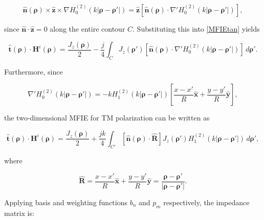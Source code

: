 \documentclass[11pt,a4paper,twoside,pdf]{article}
\numberwithin{equation}{section}
\begin{document}
\begin{equation}
\hat{\mathbf{n}}(\boldsymbol{\rho}) \times
\hat{\mathbf{z}} \times
\nabla H_0^{(2)}\!\left( k \lvert \boldsymbol{\rho} - \boldsymbol{\rho}' \rvert \right)
=
\hat{\mathbf{z}}
\left[
\hat{\mathbf{n}}(\boldsymbol{\rho}) \cdot
\nabla' H_0^{(2)}\!\left( k \lvert \boldsymbol{\rho} - \boldsymbol{\rho}' \rvert \right)
\right],
\end{equation}

since
$\hat{\mathbf{n}} \cdot \hat{\mathbf{z}} = 0$
along the entire contour $C$.
Substituting this into \ref{MFIEtan} yields

\begin{equation}
\hat{\mathbf{t}}(\boldsymbol{\rho}) \cdot \mathbf{H}^i(\boldsymbol{\rho})
=
\frac{J_z(\boldsymbol{\rho})}{2}
-
\frac{j}{4}
\int_{C}
J_z(\boldsymbol{\rho}')
\left[
\hat{\mathbf{n}}(\boldsymbol{\rho}) \cdot
\nabla' H_0^{(2)}\!\left( k \lvert \boldsymbol{\rho} - \boldsymbol{\rho}' \rvert \right)
\right]
\, d\boldsymbol{\rho'}.
\end{equation}

Furthermore, since

\begin{equation}
\nabla' H_0^{(2)}\!\left( k \lvert \boldsymbol{\rho} - \boldsymbol{\rho}' \rvert \right)
=
- k H_1^{(2)}\!\left( k \lvert \boldsymbol{\rho} - \boldsymbol{\rho}' \rvert \right)
\left[
\frac{x - x'}{R} \hat{\mathbf{x}}
+
\frac{y - y'}{R} \hat{\mathbf{y}}
\right],
\end{equation}

the two-dimensional MFIE for TM polarization can be written as

\begin{equation}
\hat{\mathbf{t}}(\boldsymbol{\rho}) \cdot \mathbf{H}^i(\boldsymbol{\rho})
=
\frac{J_z(\boldsymbol{\rho})}{2}
+
\frac{j k}{4}
\int_{C'}
\left[
\hat{\mathbf{n}}(\boldsymbol{\rho}) \cdot \hat{\mathbf{R}}
\right]
J_z(\boldsymbol{\rho}')
H_1^{(2)}\!\left( k \lvert \boldsymbol{\rho} - \boldsymbol{\rho}' \rvert \right)
\, d\boldsymbol{\rho}',
\end{equation}

where

\begin{equation}
\hat{\mathbf{R}}
=
\frac{x - x'}{R} \hat{\mathbf{x}}
+
\frac{y - y'}{R} \hat{\mathbf{y}}
=
\frac{\boldsymbol{\rho} - \boldsymbol{\rho}'}{|\boldsymbol{\rho} - \boldsymbol{\rho}'|}.
\end{equation}


Applying basis and weighting functions $b_n$ and $p_m$ respectively, the impedance matrix is:
\end{document}

